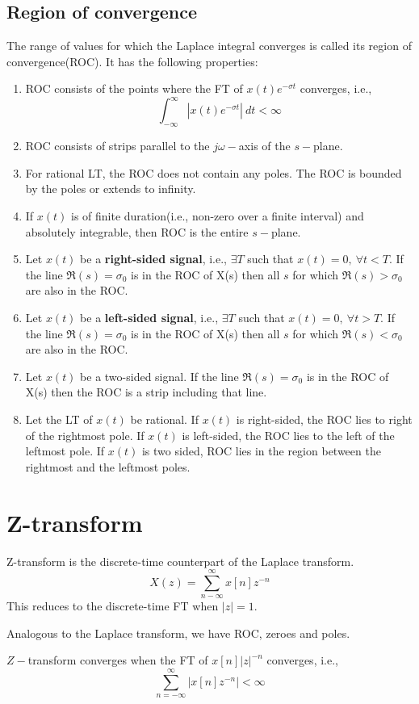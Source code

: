 \documentclass[10pt, a4paper]{extarticle}
\theoremstyle{definition}
\begin{document}
		\subsection{Region of convergence}
		The range of values for which the Laplace integral converges is called its region of convergence(ROC). It has the following properties:
		\begin{enumerate}
			\item ROC consists of the points where the FT of $x(t)e^{-\sigma t}$ converges, i.e.,
				\[\int_{-\infty}^\infty \left|x(t)e^{-\sigma t}\right|\ dt<\infty\]
			\item ROC consists of strips parallel to the $j\omega-$axis of the $s-$plane.
			\item For rational LT, the ROC does not contain any poles. The ROC is bounded by the poles or extends to infinity.
			\item If $x(t)$ is of finite duration(i.e., non-zero over a finite interval) and absolutely integrable, then ROC is the entire $s-$plane.
			\item Let $x(t)$ be a \textbf{right-sided signal}, i.e., $\exists T$ such that $x(t)=0,\ \forall t<T$. If the line $\Re(s)=\sigma_0$ is in the ROC of X(s) then all $s$ for which $\Re(s)>\sigma_0$ are also in the ROC.
			\item Let $x(t)$ be a \textbf{left-sided signal}, i.e., $\exists T$ such that $x(t)=0,\ \forall t>T$. If the line $\Re(s)=\sigma_0$ is in the ROC of X(s) then all $s$ for which $\Re(s)<\sigma_0$ are also in the ROC.
			\item Let $x(t)$ be a two-sided signal. If the line $\Re(s)=\sigma_0$ is in the ROC of X(s) then the ROC is a strip including that line.
			\item Let the LT of $x(t)$ be rational. If $x(t)$ is right-sided, the ROC lies to right of the rightmost pole. If $x(t)$ is left-sided, the ROC lies to the left of the leftmost pole. If $x(t)$ is two sided, ROC lies in the region between the rightmost and the leftmost poles.
	\end{enumerate}

	\section{Z-transform}
	Z-transform is the discrete-time counterpart of the Laplace transform.
	\[X(z)=\sum_{n-\infty}^\infty x[n]z^{-n}\]
	This reduces to the discrete-time FT when $|z|=1$.

	Analogous to the Laplace transform, we have ROC, zeroes and poles.

	$Z-$transform converges when the FT of $x[n]|z|^{-n}$ converges, i.e.,
	\[\sum_{n=-\infty}^{\infty}\left|x[n]z^{-n}\right|<\infty\]
\end{document}

